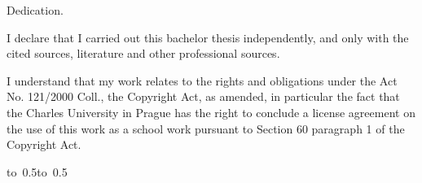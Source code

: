 
\noindent
Dedication.


\vfill

\noindent
I declare that I carried out this bachelor thesis independently, and only with the cited
sources, literature and other professional sources.

\medskip\noindent
I understand that my work relates to the rights and obligations under the Act No.
121/2000 Coll., the Copyright Act, as amended, in particular the fact that the Charles
University in Prague has the right to conclude a license agreement on the use of this
work as a school work pursuant to Section 60 paragraph 1 of the Copyright Act.

\vspace{10mm}

\hbox{\hbox to 0.5\hbox to 0.5}

\vspace{20mm}










































